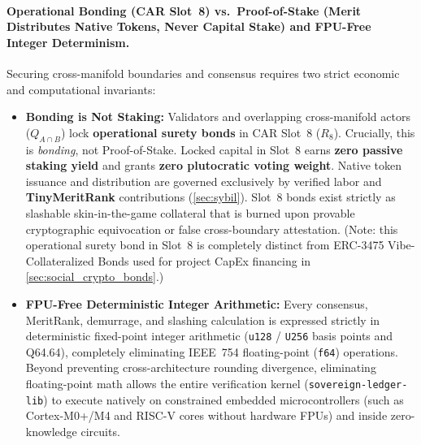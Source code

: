 \documentclass[a4paper,11pt,twoside,parskip=half-,headings=small]{scrartcl}
\newcommand{\code}[1]{\texttt{#1}}
\begin{document}
\paragraph{Operational Bonding (CAR Slot~8) vs.\ Proof-of-Stake (Merit Distributes Native Tokens, Never Capital Stake) and FPU-Free Integer Determinism.}
Securing cross-manifold boundaries and consensus requires two strict economic and computational invariants:
\begin{itemize}[nosep]
  \item \textbf{Bonding is Not Staking:} Validators and overlapping cross-manifold actors ($Q_{A \cap B}$) lock \textbf{operational surety bonds} in CAR Slot~8 ($R_8$). Crucially, this is \emph{bonding}, not Proof-of-Stake. Locked capital in Slot~8 earns \textbf{zero passive staking yield} and grants \textbf{zero plutocratic voting weight}. Native token issuance and distribution are governed exclusively by verified labor and \textbf{TinyMeritRank} contributions (\cref{sec:sybil}). Slot~8 bonds exist strictly as slashable skin-in-the-game collateral that is burned upon provable cryptographic equivocation or false cross-boundary attestation. (Note: this operational surety bond in Slot~8 is completely distinct from ERC-3475 Vibe-Collateralized Bonds used for project CapEx financing in \cref{sec:social_crypto_bonds}.)
  \item \textbf{FPU-Free Deterministic Integer Arithmetic:} Every consensus, MeritRank, demurrage, and slashing calculation is expressed strictly in deterministic fixed-point integer arithmetic (\code{u128} / \code{U256} basis points and Q64.64), completely eliminating IEEE~754 floating-point (\code{f64}) operations. Beyond preventing cross-architecture rounding divergence, eliminating floating-point math allows the entire verification kernel (\code{sovereign-ledger-lib}) to execute natively on constrained embedded microcontrollers (such as Cortex-M0+/M4 and RISC-V cores without hardware FPUs) and inside zero-knowledge circuits.
\end{itemize}
\end{document}
